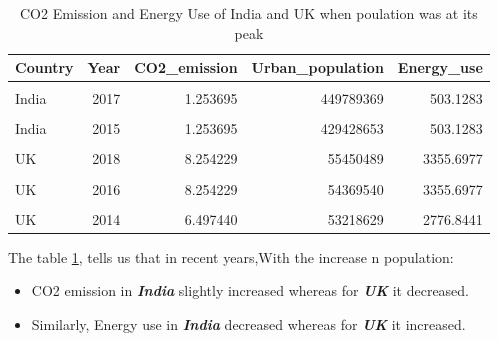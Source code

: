 \documentclass[11pt,a4paper,]{article}
\providecommand{\tightlist}{%
  \setlength{\itemsep}{0pt}\setlength{\parskip}{0pt}}
\begin{document}
\begin{table}[!h]

\caption{\label{tab:statsis}CO2 Emission and Energy Use of India and UK when poulation was at its peak}
\centering
\begin{tabular}[t]{l|r|r|r|r}
\hline
Country & Year & CO2\_emission & Urban\_population & Energy\_use\\
\hline
\cellcolor{gray!6}{India} & \cellcolor{gray!6}{2018} & \cellcolor{gray!6}{1.253695} & \cellcolor{gray!6}{460295677} & \cellcolor{gray!6}{503.1283}\\
\hline
India & 2017 & 1.253695 & 449789369 & 503.1283\\
\hline
\cellcolor{gray!6}{India} & \cellcolor{gray!6}{2016} & \cellcolor{gray!6}{1.253695} & \cellcolor{gray!6}{439498772} & \cellcolor{gray!6}{503.1283}\\
\hline
India & 2015 & 1.253695 & 429428653 & 503.1283\\
\hline
\cellcolor{gray!6}{India} & \cellcolor{gray!6}{2014} & \cellcolor{gray!6}{1.727671} & \cellcolor{gray!6}{419568459} & \cellcolor{gray!6}{636.5702}\\
\hline
UK & 2018 & 8.254229 & 55450489 & 3355.6977\\
\hline
\cellcolor{gray!6}{UK} & \cellcolor{gray!6}{2017} & \cellcolor{gray!6}{8.254229} & \cellcolor{gray!6}{54923317} & \cellcolor{gray!6}{3355.6977}\\
\hline
UK & 2016 & 8.254229 & 54369540 & 3355.6977\\
\hline
\cellcolor{gray!6}{UK} & \cellcolor{gray!6}{2015} & \cellcolor{gray!6}{8.254229} & \cellcolor{gray!6}{53813373} & \cellcolor{gray!6}{2763.9801}\\
\hline
UK & 2014 & 6.497440 & 53218629 & 2776.8441\\
\hline
\end{tabular}
\end{table}

The table \ref{tab:statsis}, tells us that in recent years,With the increase n population:

\begin{itemize}
\tightlist
\item
  CO2 emission in \textbf{\emph{India}} slightly increased whereas for \textbf{\emph{UK}} it decreased.
\item
  Similarly, Energy use in \textbf{\emph{India}} decreased whereas for \textbf{\emph{UK}} it increased.
\end{itemize}

\clearpage
\end{document}
